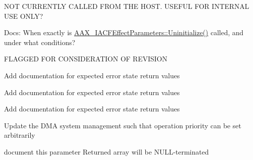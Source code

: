 \begin{DoxyRefList}
N\+O\+T C\+U\+R\+R\+E\+N\+T\+L\+Y C\+A\+L\+L\+E\+D F\+R\+O\+M T\+H\+E H\+O\+S\+T. U\+S\+E\+F\+U\+L F\+O\+R I\+N\+T\+E\+R\+N\+A\+L U\+S\+E O\+N\+L\+Y? 
\item[\label{a00383__todo000035}%
\hypertarget{a00383__todo000035}{}%
Member \hyperlink{a00061_a711969adc95624fb9ac8a3e3b2c23696}{A\+A\+X\+\_\+\+I\+A\+C\+F\+Effect\+Parameters\+:\+:Uninitialize} ()=0]Docs\+: When exactly is \hyperlink{a00061_a711969adc95624fb9ac8a3e3b2c23696}{A\+A\+X\+\_\+\+I\+A\+C\+F\+Effect\+Parameters\+::\+Uninitialize()} called, and under what conditions? 
\item[\label{a00383__todo000041}%
\hypertarget{a00383__todo000041}{}%
Member \hyperlink{a00061_a685858711efb8634ce66c327f2865c71}{A\+A\+X\+\_\+\+I\+A\+C\+F\+Effect\+Parameters\+:\+:Update\+Parameter\+Normalized\+Value} (A\+A\+X\+\_\+\+C\+Param\+I\+D i\+Parameter\+I\+D, double i\+Value, A\+A\+X\+\_\+\+E\+Update\+Source i\+Source)=0]F\+L\+A\+G\+G\+E\+D F\+O\+R C\+O\+N\+S\+I\+D\+E\+R\+A\+T\+I\+O\+N O\+F R\+E\+V\+I\+S\+I\+O\+N 
\item[\label{a00383__todo000032}%
\hypertarget{a00383__todo000032}{}%
Class \hyperlink{a00062}{A\+A\+X\+\_\+\+I\+A\+C\+F\+Effect\+Parameters\+\_\+\+V2} ]Add documentation for expected error state return values 
\item[\label{a00383__todo000033}%
\hypertarget{a00383__todo000033}{}%
Class \hyperlink{a00063}{A\+A\+X\+\_\+\+I\+A\+C\+F\+Effect\+Parameters\+\_\+\+V3} ]Add documentation for expected error state return values 
\item[\label{a00383__todo000034}%
\hypertarget{a00383__todo000034}{}%
Class \hyperlink{a00064}{A\+A\+X\+\_\+\+I\+A\+C\+F\+Effect\+Parameters\+\_\+\+V4} ]Add documentation for expected error state return values 
\item[\label{a00383__todo000042}%
\hypertarget{a00383__todo000042}{}%
Member \hyperlink{a00088_aff9e1c726bbdf500f2d61b164589744e}{A\+A\+X\+\_\+\+I\+Component\+Descriptor\+:\+:Add\+Dma\+Instance} (A\+A\+X\+\_\+\+C\+Field\+Index in\+Field\+Index, \hyperlink{a00095_af8d0f19f2896dd6dbd126b919b24e39b}{A\+A\+X\+\_\+\+I\+Dma\+::\+E\+Mode} in\+Dma\+Mode)=0]Update the D\+M\+A system management such that operation priority can be set arbitrarily 
\item[\label{a00383__todo000045}%
\hypertarget{a00383__todo000045}{}%
Member \hyperlink{a00088_a0e8f6217d0f317c728b3e30f15f181d2}{A\+A\+X\+\_\+\+I\+Component\+Descriptor\+:\+:Add\+Process\+Proc} (\hyperlink{a00112}{A\+A\+X\+\_\+\+I\+Property\+Map} $\ast$in\+Properties, A\+A\+X\+\_\+\+C\+Selector $\ast$out\+Proc\+I\+Ds=N\+U\+L\+L, int32\+\_\+t in\+Proc\+I\+Ds\+Size=0)=0]document this parameter Returned array will be N\+U\+L\+L-\/terminated 

\end{DoxyRefList}
